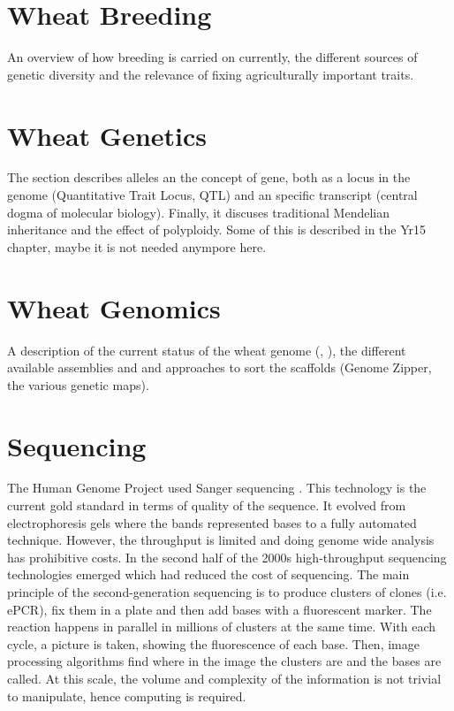 

\section{Wheat Breeding}
An overview of how breeding is carried on currently, the different sources of genetic diversity and the relevance of fixing agriculturally important traits. 
\section{Wheat Genetics}
The section describes alleles an the concept of gene, both as a locus in the genome (Quantitative Trait Locus, QTL) and an specific transcript (central dogma of molecular biology). Finally, it discuses traditional Mendelian inheritance and the effect of polyploidy.  Some of this is described in the Yr15 chapter, maybe it is not needed anympore here. 
\section{Wheat Genomics}
A description of the current status of the wheat genome (\citet{Mayer2014}, \citet{Chapman2015}), the different available assemblies and and approaches to sort the scaffolds (Genome Zipper, the various genetic maps).  
\section{Sequencing} 



The Human Genome Project used Sanger sequencing \cite{Lander2001}. This technology is the current gold standard in terms of quality of the sequence. It evolved from electrophoresis gels where the bands represented bases to a fully automated technique. However, the throughput is limited and doing genome wide analysis has prohibitive costs. In the second half of the 2000s high-throughput sequencing technologies emerged which had reduced the cost of sequencing. The main principle of the second-generation sequencing is to produce clusters of clones (i.e. ePCR), fix them in a plate and then add bases with a fluorescent marker. The reaction happens in parallel in millions of clusters at the same time. With each cycle, a picture is taken, showing the fluorescence of each base. Then, image processing algorithms find where in the image the clusters are and the bases are called. At this scale, the volume and complexity of the information is not trivial to manipulate, hence computing is required. 


